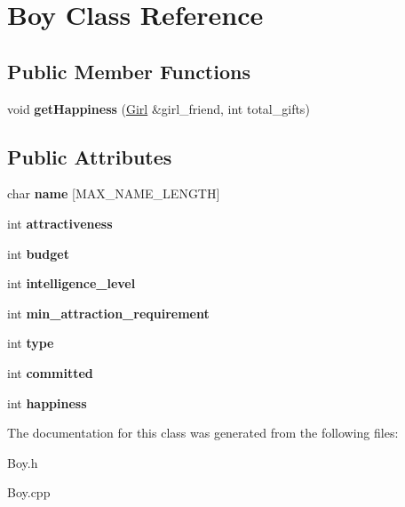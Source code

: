 \hypertarget{class_boy}{}\section{Boy Class Reference}
\label{class_boy}
\subsection*{Public Member Functions}
\begin{DoxyCompactItemize}
\item 
\mbox{\label{class_boy_a45d40d86f500ac876afd0af425a6acf5}} 
void {\bfseries get\+Happiness} (\hyperlink{class_girl}{Girl} \&girl\+\_\+friend, int total\+\_\+gifts)
\end{DoxyCompactItemize}
\subsection*{Public Attributes}
\begin{DoxyCompactItemize}
\item 
\mbox{\label{class_boy_a3ceaefba33434bcf8ec3c88fc4622af8}} 
char {\bfseries name} \mbox{[}M\+A\+X\+\_\+\+N\+A\+M\+E\+\_\+\+L\+E\+N\+G\+TH\mbox{]}
\item 
\mbox{\label{class_boy_a679e59279116986aaae135d8a524bc46}} 
int {\bfseries attractiveness}
\item 
\mbox{\label{class_boy_a3b755250e77f892967872c7eb4c26685}} 
int {\bfseries budget}
\item 
\mbox{\label{class_boy_a2974e9a9600a7d88256b159b868b80c0}} 
int {\bfseries intelligence\+\_\+level}
\item 
\mbox{\label{class_boy_a3b85e00dc9b5e1b67a6954a1230656c4}} 
int {\bfseries min\+\_\+attraction\+\_\+requirement}
\item 
\mbox{\label{class_boy_a1b907f52b73e8355ce0dd02db65afa4f}} 
int {\bfseries type}
\item 
\mbox{\label{class_boy_ab92b452f9cf9d97fc0c0f8aa6139da46}} 
int {\bfseries committed}
\item 
\mbox{\label{class_boy_adaf15f15972678dbd77e8b8b319d5767}} 
int {\bfseries happiness}
\end{DoxyCompactItemize}


The documentation for this class was generated from the following files\+:\begin{DoxyCompactItemize}
\item 
Boy.\+h\item 
Boy.\+cpp\end{DoxyCompactItemize}
